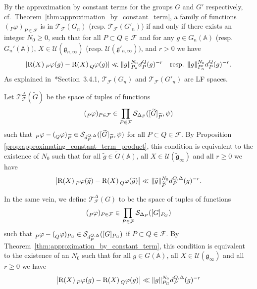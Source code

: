 \documentclass[letterpaper,11pt]{amsart}
\newcommand{\fg}{\mathfrak{g}}
\newcommand{\bA}{\mathbb{A}}
\newcommand{\cF}{\mathcal{F}}
\newcommand{\cS}{\mathcal{S}}
\newcommand{\cT}{\mathcal{T}}
\newcommand{\cU}{\mathcal{U}}
\newcommand{\<}{\negthickspace}
\providecommand{\abs}[1]{\lvert#1\rvert}
\providecommand{\aabs}[1]{\lVert#1\rVert}
\newcommand{\valP}[1]{\left|#1\right|}
\theoremstyle{definition}
\theoremstyle{plain}
\theoremstyle{remark}
\numberwithin{equation}{section}
\begin{document}
By the approximation by constant terms for the
groups $G$ and $G'$ respectively,
cf.~Theorem~\ref{thm:approximation_by_constant_term}, a family of functions
$({}_P \varphi)_{P \in \cF}$ is in
$\cT_{\cF}(G_n)$ (resp.
$\cT_{\cF}(G'_n)$) if and only if there exists an
integer $N_0 \ge 0$, such that for all $P \subset Q \in \cF$ and for any $g \in G_n(\bA)$ (resp. $G_n'(\bA))$,
$X \in \cU(\fg_{n,\infty})$ (resp. $\cU(\fg'_{n,\infty}))$, and $r>0$ we have
    \begin{equation} \label{eq:equivalent_definition_T_space}
    \abs{\mathrm{R}(X) \prescript{}{P}{\varphi}(g) -
    \mathrm{R}(X) \prescript{}{Q}{\varphi}(g) }
    \ll \aabs{g}_{P_n}^{N_0} d_{P}^{Q}(g)^{-r} \quad
    \text{resp. }\aabs{g}_{P'_n}^{N_0} d_{P}^{Q}(g)^{-r}.
    \end{equation}
As explained in~\cite{BPCZ}*{Section~3.4.1}, $\cT_{\cF}(G_n)$ and
$\cT_{\cF}(G'_n)$ are LF spaces.

Let $\cT_{\cF}^{\Delta}(\widetilde{G})$ be the space of tuples of
functions
    \[
    (\prescript{}{P}{\varphi})_{P \in \cF}
    \in \prod_{P \in \cF}
    \cS_{\Delta_P}([\widetilde{G}]_{\widetilde{P}},\psi)
    \]
such that
$\prescript{}{P}{\varphi}-(\prescript{}{Q}{\varphi})_{\widetilde{P}} \in
\cS_{d_P^{Q,\Delta}} ([\widetilde{G}]_{\widetilde{P}},\psi)$ for all $P
\subset Q \in \cF$. By Proposition
\ref{prop:approximating_constant_term_product}, this condition is equivalent
to the existence of $N_0$ such that for all $\widetilde{g} \in \widetilde{G}(\bA)$, all
$X \in \cU(\widetilde{\fg}_\infty)$ and all $r \geq 0$ we have
    \begin{equation}    \label{eq:T_Delta_jacobi}
    \valP{\mathrm{R}(X) \prescript{}{P}{\varphi}(\widetilde{g}) -
    \mathrm{R}(X) \prescript{}{Q}{\varphi}(\widetilde{g})}
    \ll \aabs{\widetilde{g}}_{\widetilde{P}}^{N_0}
    d_{P}^{Q, \Delta}(g)^{-r}.
    \end{equation}

In the same vein, we define $\cT_{\cF}^{\Delta}(G)$ to be the
space of tuples of functions
    \[
    (\prescript{}{P}{\varphi})_{P \in \cF}
    \in \prod_{P \in \cF}
    \cS_{\Delta_P}([G]_{P_{G}})
    \]
such that $\prescript{}{P}{\varphi}-(\prescript{}{Q}{\varphi})_{P_{G}} \in
\cS_{d_P^{Q,\Delta}} ([G]_{P_{G}})$ if $P \subset Q \in \cF$. By
Theorem~\ref{thm:approximation_by_constant_term}, this condition is
equivalent to the existence of an $N_0$ such that for all $g \in G(\bA)$, all $X \in \cU(\fg_\infty)$ and all
$r \geq 0$ we have
    \begin{equation}    \label{eq:T_Delta_G}
    \valP{\mathrm{R}(X) \prescript{}{P}{\varphi}(g) -
    \mathrm{R}(X) \prescript{}{Q}{\varphi}(g)} \ll \aabs{g}_{P_G}^{N_0}
    d_{P}^{Q, \Delta}(g)^{-r}
    \end{equation}
\end{document}
